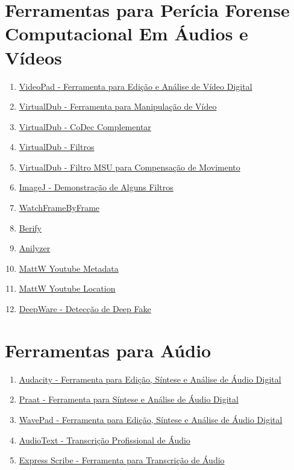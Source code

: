 \documentclass{article}
\begin{document}
\section{Ferramentas para Perícia Forense Computacional Em Áudios e Vídeos}
\begin{enumerate}
\item \href{https://www.nchsoftware.com/videopad/index.html}{VideoPad - Ferramenta para Edição e Análise de Vídeo Digital}
\item \href{https://www.virtualdub.org/}{VirtualDub - Ferramenta para Manipulação de Vídeo}
\item \href{https://sourceforge.net/projects/x264vfw/}{VirtualDub - CoDec Complementar}
\item \href{https://www.virtualdub.org/virtualdub_filters.html}{VirtualDub - Filtros}
\item \href{https://videoprocessing.ai/video_filters/motion-estimation.html}{VirtualDub - Filtro MSU para Compensação de Movimento}
\item \href{https://www.youtube.com/watch?v=P1OjcHWeuew}{ImageJ - Demonstração de Alguns Filtros}
\item \href{http://www.watchframebyframe.com/}{WatchFrameByFrame}
\item \href{https://berify.com/}{Berify}
\item \href{http://anilyzer.com/}{Anilyzer}
\item \href{https://mattw.io/youtube-metadata/}{MattW Youtube Metadata}
\item \href{https://mattw.io/youtube-geofind/location}{MattW Youtube Location}
\item \href{https://deepware.ai/}{DeepWare - Detecção de Deep Fake}
\end{enumerate}
\section{Ferramentas para Aúdio}
\begin{enumerate}
\item \href{https://www.audacityteam.org/download/}{Audacity - Ferramenta para Edição, Síntese e Análise de Áudio Digital}
\item \href{https://www.fon.hum.uva.nl/praat/}{Praat - Ferramenta para Síntese e Análise de Áudio Digital}
\item \href{https://www.nch.com.au/wavepad/index.html}{WavePad - Ferramenta para Edição, Síntese e Análise de Áudio Digital}
\item \href{https://www.audiotext.com.br/}{AudioText - Transcrição Profissional de Áudio}
\item \href{https://www.nch.com.au/scribe/index.html}{Express Scribe - Ferramenta para Transcrição de Áudio}
\end{enumerate}
\end{document}
